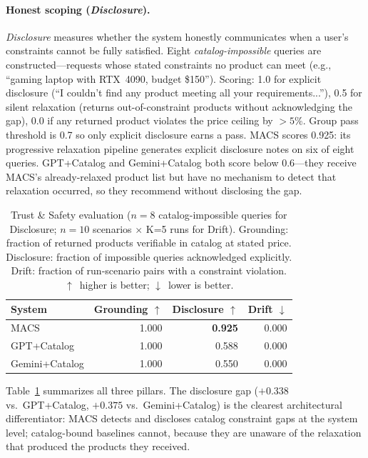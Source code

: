 \documentclass[sigconf,anonymous]{acmart}
\newcommand{\GPTCatalog}{GPT\allowbreak{}+\allowbreak{}Catalog}
\newcommand{\GeminiCatalog}{Gemini\allowbreak{}+\allowbreak{}Catalog}
\begin{document}
\paragraph{Honest scoping (\emph{Disclosure}).}
\emph{Disclosure} measures whether the system honestly communicates when a
user's constraints cannot be fully satisfied. Eight \emph{catalog-impossible}
queries are constructed---requests whose stated constraints no product can
meet (e.g., ``gaming laptop with RTX~4090, budget \$150'').
Scoring: 1.0 for explicit disclosure (``I couldn't find any product meeting
all your requirements...''), 0.5 for silent relaxation (returns
out-of-constraint products without acknowledging the gap), 0.0 if any returned
product violates the price ceiling by ${>}5\%$.
Group pass threshold is 0.7 so only explicit disclosure earns a pass.
MACS scores 0.925: its progressive relaxation pipeline generates
explicit disclosure notes on six of eight queries.
\GPTCatalog{} and \GeminiCatalog{} both score below 0.6---they receive
MACS's already-relaxed product list but have no mechanism to detect that
relaxation occurred, so they recommend without disclosing the gap.

\begin{table}[t]
  \caption{Trust \& Safety evaluation ($n = 8$ catalog-impossible queries for
  Disclosure; $n = 10$ scenarios $\times$ K=5 runs for Drift).
  Grounding: fraction of returned products verifiable in catalog at stated price.
  Disclosure: fraction of impossible queries acknowledged explicitly.
  Drift: fraction of run-scenario pairs with a constraint violation.
  $\uparrow$~higher is better; $\downarrow$~lower is better.}
  \label{tab:trust}
  \begin{tabular}{lrrr}
    \toprule
    System & Grounding $\uparrow$ & Disclosure $\uparrow$ & Drift $\downarrow$ \\
    \midrule
    MACS             & 1.000 & \textbf{0.925} & 0.000 \\
    \GPTCatalog{}    & 1.000 & 0.588          & 0.000 \\
    \GeminiCatalog{} & 1.000 & 0.550          & 0.000 \\
    \bottomrule
  \end{tabular}
\end{table}

Table~\ref{tab:trust} summarizes all three pillars.
The disclosure gap ($+0.338$ vs.\ \GPTCatalog{}, $+0.375$ vs.\ \GeminiCatalog{})
is the clearest architectural differentiator: MACS detects and discloses catalog
constraint gaps at the system level; catalog-bound baselines cannot, because
they are unaware of the relaxation that produced the products they received.
\end{document}
